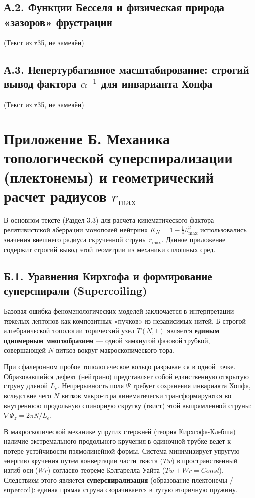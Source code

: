 \documentclass[11pt,a4paper]{article}
\begin{document}
	\subsection*{А.2. Функции Бесселя и физическая природа «зазоров» фрустрации}
	(Текст из v35, не заменён)
	
	\subsection*{А.3. Непертурбативное масштабирование: строгий вывод фактора $\alpha^{-1}$ для инварианта Хопфа}
	(Текст из v35, не заменён)
	
	\section*{Приложение Б. Механика топологической суперспирализации (плектонемы) и геометрический расчет радиусов $r_{\text{max}}$}
	
	В основном тексте (Раздел 3.3) для расчета кинематического фактора релятивистской аберрации монополей нейтрино $K_N = 1 - \frac{1}{4}\beta_{\text{max}}^2$ использовались значения внешнего радиуса скрученной струны $r_{\text{max}}$. Данное приложение содержит строгий вывод этой геометрии из механики сплошных сред.
	
	\subsection*{Б.1. Уравнения Кирхгофа и формирование суперспирали (Supercoiling)}
	Базовая ошибка феноменологических моделей заключается в интерпретации тяжелых лептонов как композитных «пучков» из независимых нитей. В строгой алгебраической топологии торический узел $T(N,1)$ является \textbf{единым одномерным многообразием} — одной замкнутой фазовой трубкой, совершающей $N$ витков вокруг макроскопического тора.
	
	При сфалеронном пробое топологическое кольцо разрывается в одной точке. Образовавшийся дефект (нейтрино) представляет собой единственную открытую струну длиной $L_e$. Непрерывность поля $\Psi$ требует сохранения инварианта Хопфа, вследствие чего $N$ витков макро-тора кинематически трансформируются во внутреннюю продольную спинорную скрутку (твист) этой выпрямленной струны: $\nabla \Phi_z = 2\pi N / L_e$.
	
	В макроскопической механике упругих стержней (теория Кирхгофа-Клебша) наличие экстремального продольного кручения в одиночной трубке ведет к потере устойчивости прямолинейной формы. Система минимизирует упругую энергию кручения путем конвертации части твиста ($Tw$) в пространственный изгиб оси ($Wr$) согласно теореме Кэлгарелла-Уайта ($Tw + Wr = Const$).
	Следствием этого является \textbf{суперспирализация} (образование плектонемы / supercoil): единая прямая струна сворачивается в тугую вторичную пружину. 
	
\end{document}
